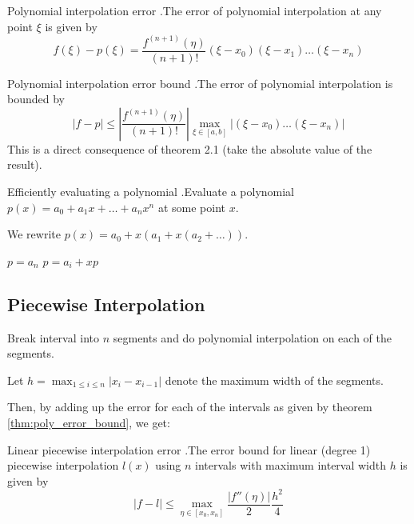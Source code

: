 \documentclass[12pt,letterpaper]{article}
\begin{document}
\begin{theo}{Polynomial interpolation error}
.The error of polynomial interpolation at any point $\xi$ is given by
\begin{equation}
	f(\xi) - p(\xi) = \frac{f^{(n+1)}(\eta)}{(n+1)!}(\xi - x_0)(\xi - x_1) \dots (\xi-x_n)
\end{equation}
\label{thm:poly_error}
\end{theo}
\begin{coro}{Polynomial interpolation error bound}
.The error of polynomial interpolation is bounded by
\begin{equation}
	\big| f - p \big| \leq \left| \frac{f^{(n+1)}(\eta)}{(n+1)!} \right| \max_{\xi \in [a,b]} \big| (\xi - x_0) \dots (\xi-x_n) \big|
\end{equation}
This is a direct consequence of theorem 2.1 (take the absolute value of the result).
\label{thm:poly_error_bound}
\end{coro}

\begin{algo}{Efficiently evaluating a polynomial}
.Evaluate a polynomial $p(x) = a_0 + a_1x + \dots + a_nx^n$ at some point $x$.

\medskip

We rewrite $p(x) = a_0 + x(a_1 + x(a_2 + \dots ))$.
\begin{algorithm}[H]
\caption{Evaluate a polynomial}
\begin{algorithmic}[1]
\State $p = a_n$
	\State $p = a_i + xp$
\EndFor
\end{algorithmic}
\end{algorithm}
\label{alg:poly_eval}
\end{algo}

\subsection{Piecewise Interpolation}
Break interval into $n$ segments and do polynomial interpolation on each of the segments.

Let $h = \max_{1 \leq i \leq n} \big| x_i - x_{i-1} \big|$ denote the maximum width of the segments.

Then, by adding up the error for each of the intervals as given by theorem \ref{thm:poly_error_bound}, we get:
\begin{theo}{Linear piecewise interpolation error}
.The error bound for linear (degree 1) piecewise interpolation $l(x)$ using $n$ intervals with maximum interval width $h$ is given by
\begin{equation}
	\big| f - l \big| \leq \max_{\eta \in [x_0, x_n]} \frac{\big| f''(\eta) \big|}{2} \frac{h^2}{4}
\end{equation}
\label{thm:piecewise_error}
\end{theo}
\end{document}
